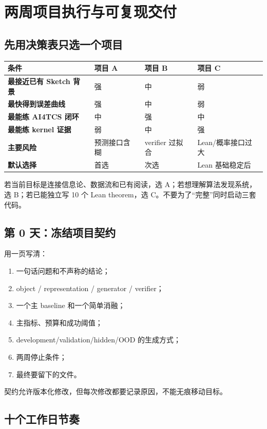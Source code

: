 \chapter{两周项目执行与可复现交付}

\section{先用决策表只选一个项目}

\begin{center}
\begin{tabularx}{0.96\textwidth}{>{\bfseries}lYYY}
\toprule
条件 & 项目 A & 项目 B & 项目 C \\
\midrule
最接近已有 Sketch 背景 & 强 & 中 & 弱 \\
最快得到误差曲线 & 强 & 中 & 弱 \\
最能练 AI4TCS 闭环 & 中 & 强 & 中 \\
最能练 kernel 证据 & 弱 & 中 & 强 \\
主要风险 & 预测接口含糊 & verifier 过拟合 & Lean/概率接口过大 \\
默认选择 & 首选 & 次选 & Lean 基础稳定后 \\
\bottomrule
\end{tabularx}
\end{center}

若当前目标是连接信息论、数据流和已有阅读，选 A；若想理解算法发现系统，选 B；若已能独立写 10 个 Lean theorem，选 C。不要为了“完整”同时启动三套代码。

\section{第 0 天：冻结项目契约}

用一页写清：
\begin{enumerate}
  \item 一句话问题和不声称的结论；
  \item object / representation / generator / verifier；
  \item 一个主 baseline 和一个简单消融；
  \item 主指标、预算和成功阈值；
  \item development/validation/hidden/OOD 的生成方式；
  \item 两周停止条件；
  \item 最终要留下的文件。
\end{enumerate}
契约允许版本化修改，但每次修改都要记录原因，不能无痕移动目标。

\section{十个工作日节奏}

